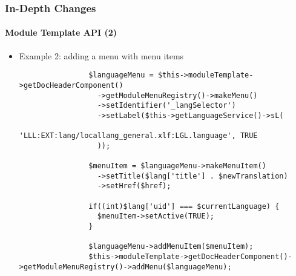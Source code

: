 
\begin{frame}[fragile]
	\frametitle{In-Depth Changes}
	\framesubtitle{Module Template API (2)}

	\lstset{basicstyle=\tiny\ttfamily}

	\begin{itemize}
		\item Example 2: adding a menu with menu items

			\begin{lstlisting}
				$languageMenu = $this->moduleTemplate->getDocHeaderComponent()
				  ->getModuleMenuRegistry()->makeMenu()
				  ->setIdentifier('_langSelector')
				  ->setLabel($this->getLanguageService()->sL(
				    'LLL:EXT:lang/locallang_general.xlf:LGL.language', TRUE
				  ));

				$menuItem = $languageMenu->makeMenuItem()
				  ->setTitle($lang['title'] . $newTranslation)
				  ->setHref($href);

				if((int)$lang['uid'] === $currentLanguage) {
				  $menuItem->setActive(TRUE);
				}

				$languageMenu->addMenuItem($menuItem);
				$this->moduleTemplate->getDocHeaderComponent()->getModuleMenuRegistry()->addMenu($languageMenu);
			\end{lstlisting}
	\end{itemize}

\end{frame}



